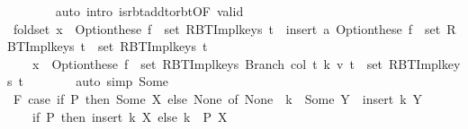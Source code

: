 \begin{isabellebody}
\ \ \ \ \ \ \isamarkupfalse%
\ {\isacharparenleft}{\kern0pt}auto\ intro{\isacharcolon}{\kern0pt}\ is{\isacharunderscore}{\kern0pt}rbt{\isacharunderscore}{\kern0pt}add{\isacharunderscore}{\kern0pt}to{\isacharunderscore}{\kern0pt}rbt{\isacharbrackleft}{\kern0pt}OF\ valid{\isacharbrackright}{\kern0pt}{\isacharparenright}{\kern0pt}\isanewline
\ \ \ \ \isamarkupfalse%
\ fold{\isacharunderscore}{\kern0pt}set{\isacharcolon}{\kern0pt}\ {\isachardoublequoteopen}x\ {\isasymin}\ Option{\isachardot}{\kern0pt}these\ {\isacharparenleft}{\kern0pt}f\ {\isacharbackquote}{\kern0pt}\ set\ {\isacharparenleft}{\kern0pt}RBT{\isacharunderscore}{\kern0pt}Impl{\isachardot}{\kern0pt}keys\ t{}{\isacharparenright}{\kern0pt}{\isacharparenright}{\kern0pt}\ {\isasymunion}\ {\isacharparenleft}{\kern0pt}insert\ a\ {\isacharparenleft}{\kern0pt}Option{\isachardot}{\kern0pt}these\ {\isacharparenleft}{\kern0pt}f\ {\isacharbackquote}{\kern0pt}\ set\ {\isacharparenleft}{\kern0pt}RBT{\isacharunderscore}{\kern0pt}Impl{\isachardot}{\kern0pt}keys\ t{}{\isacharparenright}{\kern0pt}{\isacharparenright}{\kern0pt}\ {\isasymunion}\ set\ {\isacharparenleft}{\kern0pt}RBT{\isacharunderscore}{\kern0pt}Impl{\isachardot}{\kern0pt}keys\ t{\isacharprime}{\kern0pt}{\isacharparenright}{\kern0pt}{\isacharparenright}{\kern0pt}{\isacharparenright}{\kern0pt}\ {\isasymlongleftrightarrow}\isanewline
\ \ \ \ x\ {\isasymin}\ Option{\isachardot}{\kern0pt}these\ {\isacharparenleft}{\kern0pt}f\ {\isacharbackquote}{\kern0pt}\ set\ {\isacharparenleft}{\kern0pt}RBT{\isacharunderscore}{\kern0pt}Impl{\isachardot}{\kern0pt}keys\ {\isacharparenleft}{\kern0pt}Branch\ col\ t{}\ k\ v\ t{}{\isacharparenright}{\kern0pt}{\isacharparenright}{\kern0pt}{\isacharparenright}{\kern0pt}\ {\isasymunion}\ set\ {\isacharparenleft}{\kern0pt}RBT{\isacharunderscore}{\kern0pt}Impl{\isachardot}{\kern0pt}keys\ t{\isacharprime}{\kern0pt}{\isacharparenright}{\kern0pt}{\isachardoublequoteclose}\isanewline
\ \ \ \ \ \ \isamarkupfalse%
\ {\isacharparenleft}{\kern0pt}auto\ simp{\isacharcolon}{\kern0pt}\ Some{\isacharparenright}{\kern0pt}\isanewline
\ \ \ \ \isamarkupfalse%
\ F{}{\isacharcolon}{\kern0pt}\ {\isachardoublequoteopen}{\isacharparenleft}{\kern0pt}case\ if\ P\ then\ Some\ X\ else\ None\ of\ None\ {\isasymRightarrow}\ {\isacharbraceleft}{\kern0pt}k{\isacharbraceright}{\kern0pt}\ {\isacharbar}{\kern0pt}\ Some\ Y\ {\isasymRightarrow}\ insert\ k\ Y{\isacharparenright}{\kern0pt}\ {\isacharequal}{\kern0pt}\isanewline
\ \ \ \ {\isacharparenleft}{\kern0pt}if\ P\ then\ {\isacharparenleft}{\kern0pt}insert\ k\ X{\isacharparenright}{\kern0pt}\ else\ {\isacharbraceleft}{\kern0pt}k{\isacharbraceright}{\kern0pt}{\isacharparenright}{\kern0pt}{\isachardoublequoteclose}\ \ P\ X\isanewline

\end{isabellebody}
